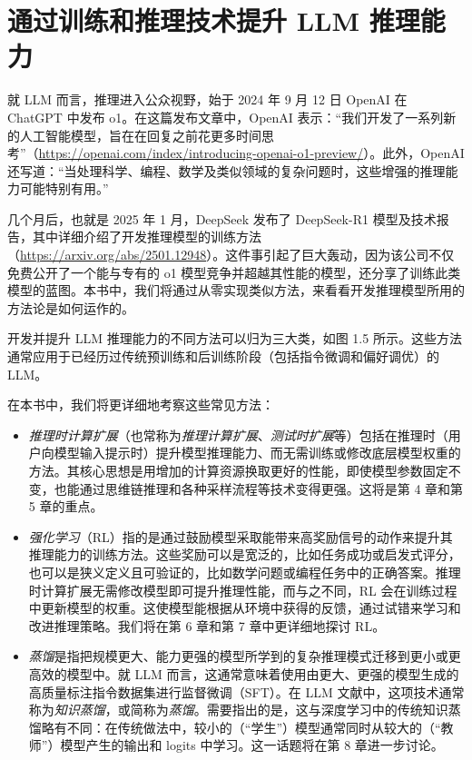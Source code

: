 \section{通过训练和推理技术提升 LLM 推理能力}

就 LLM 而言，推理进入公众视野，始于 2024 年 9 月 12 日 OpenAI 在 ChatGPT 中发布 o1。在这篇发布文章中，OpenAI 表示：“我们开发了一系列新的人工智能模型，旨在在回复之前花更多时间思考”（\href{https://openai.com/index/introducing-openai-o1-preview/}{https://openai.com/index/introducing-openai-o1-preview/}）。此外，OpenAI 还写道：“当处理科学、编程、数学及类似领域的复杂问题时，这些增强的推理能力可能特别有用。”

几个月后，也就是 2025 年 1 月，DeepSeek 发布了 DeepSeek-R1 模型及技术报告，其中详细介绍了开发推理模型的训练方法（\href{https://arxiv.org/abs/2501.12948}{https://arxiv.org/abs/2501.12948}）。这件事引起了巨大轰动，因为该公司不仅免费公开了一个能与专有的 o1 模型竞争并超越其性能的模型，还分享了训练此类模型的蓝图。本书中，我们将通过从零实现类似方法，来看看开发推理模型所用的方法论是如何运作的。

开发并提升 LLM 推理能力的不同方法可以归为三大类，如图 1.5 所示。这些方法通常应用于已经历过传统预训练和后训练阶段（包括指令微调和偏好调优）的 LLM。


在本书中，我们将更详细地考察这些常见方法：

\begin{itemize}
\item \emph{推理时计算扩展}（也常称为\emph{推理计算扩展}、\emph{测试时扩展}等）包括在推理时（用户向模型输入提示时）提升模型推理能力、而无需训练或修改底层模型权重的方法。其核心思想是用增加的计算资源换取更好的性能，即使模型参数固定不变，也能通过思维链推理和各种采样流程等技术变得更强。这将是第 4 章和第 5 章的重点。
\item \emph{强化学习}（RL）指的是通过鼓励模型采取能带来高奖励信号的动作来提升其推理能力的训练方法。这些奖励可以是宽泛的，比如任务成功或启发式评分，也可以是狭义定义且可验证的，比如数学问题或编程任务中的正确答案。\newline 推理时计算扩展无需修改模型即可提升推理性能，而与之不同，RL 会在训练过程中更新模型的权重。这使模型能根据从环境中获得的反馈，通过试错来学习和改进推理策略。我们将在第 6 章和第 7 章中更详细地探讨 RL。
\item \emph{蒸馏}是指把规模更大、能力更强的模型所学到的复杂推理模式迁移到更小或更高效的模型中。就 LLM 而言，这通常意味着使用由更大、更强的模型生成的高质量标注指令数据集进行监督微调（SFT）。在 LLM 文献中，这项技术通常称为\emph{知识蒸馏}，或简称为\emph{蒸馏}。需要指出的是，这与深度学习中的传统知识蒸馏略有不同：在传统做法中，较小的（“学生”）模型通常同时从较大的（“教师”）模型产生的输出和 logits 中学习。这一话题将在第 8 章进一步讨论。
\end{itemize}

